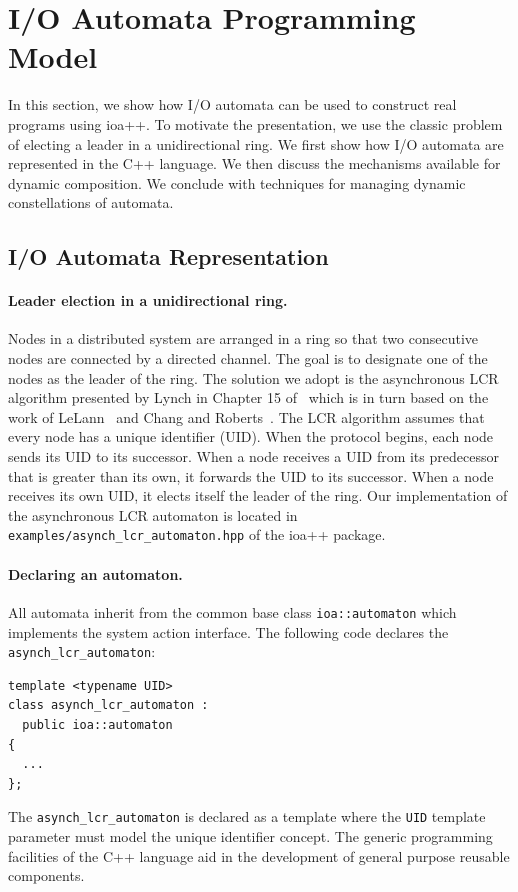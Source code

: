 \section{I/O Automata Programming Model\label{representation}}

In this section, we show how I/O automata can be used to construct real programs using ioa++.
To motivate the presentation, we use the classic problem of electing a leader in a unidirectional ring.
We first show how I/O automata are represented in the C++ language.
We then discuss the mechanisms available for dynamic composition.
We conclude with techniques for managing dynamic constellations of automata.

\subsection{I/O Automata Representation}

\paragraph{Leader election in a unidirectional ring.}
Nodes in a distributed system are arranged in a ring so that two consecutive nodes are connected by a directed channel.
The goal is to designate one of the nodes as the leader of the ring.
The solution we adopt is the asynchronous LCR algorithm presented by Lynch in Chapter 15 of~\cite{lynch1996distributed} which is in turn based on the work of LeLann~\cite{le1977distributed} and Chang and Roberts~\cite{chang1979improved}.
The LCR algorithm assumes that every node has a unique identifier (UID).
When the protocol begins, each node sends its UID to its successor.
When a node receives a UID from its predecessor that is greater than its own, it forwards the UID to its successor.
When a node receives its own UID, it elects itself the leader of the ring.
Our implementation of the asynchronous LCR automaton is located in \verb+examples/asynch_lcr_automaton.hpp+ of the ioa++ package.

\paragraph{Declaring an automaton.}
All automata inherit from the common base class \verb+ioa::automaton+ which implements the system action interface.
The following code declares the \verb+asynch_lcr_automaton+:
\begin{lstlisting}
template <typename UID>
class asynch_lcr_automaton :
  public ioa::automaton
{
  ...
};
\end{lstlisting}
The \verb+asynch_lcr_automaton+ is declared as a template where the \verb+UID+ template parameter must model the unique identifier concept.
The generic programming facilities of the C++ language aid in the development of general purpose reusable components.

